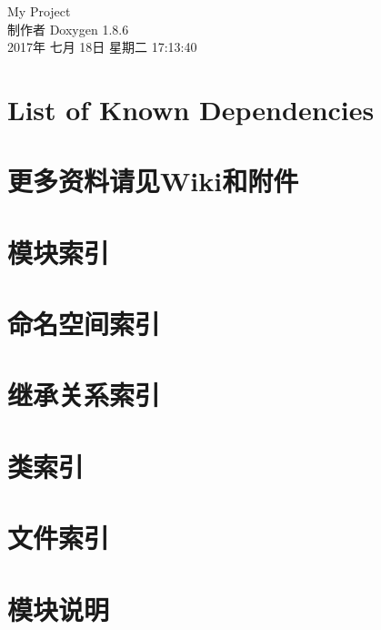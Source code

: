 \documentclass[twoside]{book}
\newcommand{\clearemptydoublepage}{%
  \newpage{\pagestyle{empty}\cleardoublepage}%
}
\begin{document}
\hypersetup{pageanchor=false}
\begin{titlepage}
\vspace*{7cm}
\begin{center}%
{\Large My Project }\\
\vspace*{1cm}
{\large 制作者 Doxygen 1.8.6}\\
\vspace*{0.5cm}
{\small 2017年 七月 18日 星期二 17:13:40}\\
\end{center}
\end{titlepage}
\clearemptydoublepage
\tableofcontents
\clearemptydoublepage
{}
\hypersetup{pageanchor=true}

\chapter{List of Known Dependencies}
\label{md_Dependencies}
\hypertarget{md_Dependencies}{}

\chapter{更多资料请见\-Wiki和附件}
\label{md_README}
\hypertarget{md_README}{}

\chapter{模块索引}

\chapter{命名空间索引}

\chapter{继承关系索引}

\chapter{类索引}

\chapter{文件索引}

\chapter{模块说明}



\end{document}
